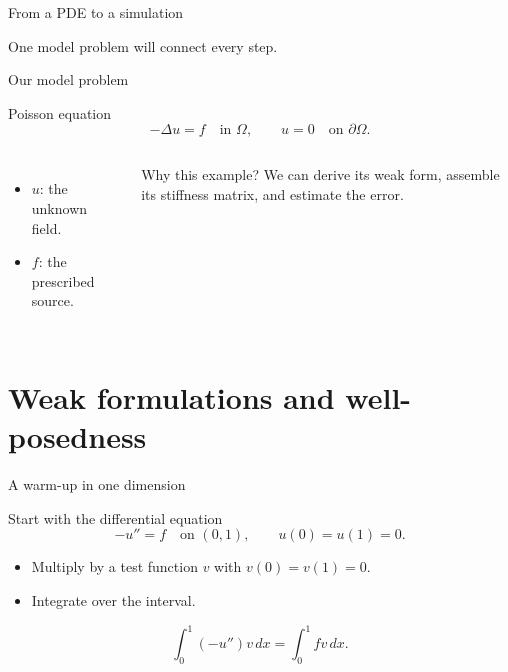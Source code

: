 \documentclass[aspectratio=169,11pt]{beamer}
\begin{document}
\begin{frame}{From a PDE to a simulation}
\begin{center}
\end{center}
\vspace{5mm}
\begin{center}\large One model problem will connect every step.\end{center}
\end{frame}

\begin{frame}{Our model problem}
\begin{block}{Poisson equation}
\[
-\Delta u=f\quad\text{in }\Omega,\qquad u=0\quad\text{on }\partial\Omega.
\]
\end{block}\begin{columns}[c,onlytextwidth]
\begin{itemize}
\item $u$: the unknown field.
\item $f$: the prescribed source.
\end{itemize}
\begin{exampleblock}{Why this example?}
We can derive its weak form, assemble its stiffness matrix, and estimate the error.
\end{exampleblock}
\end{columns}
\end{frame}

\section{Weak formulations and well-posedness}
\begin{frame}{A warm-up in one dimension}
\begin{block}{Start with the differential equation}
\[
-u''=f\quad\text{on }(0,1),\qquad u(0)=u(1)=0.
\]
\end{block}\begin{itemize}
\item Multiply by a test function $v$ with $v(0)=v(1)=0$.
\item Integrate over the interval.
\end{itemize}\[
\int_0^1(-u'')v\,dx=\int_0^1fv\,dx.
\]
\end{frame}
\end{document}
